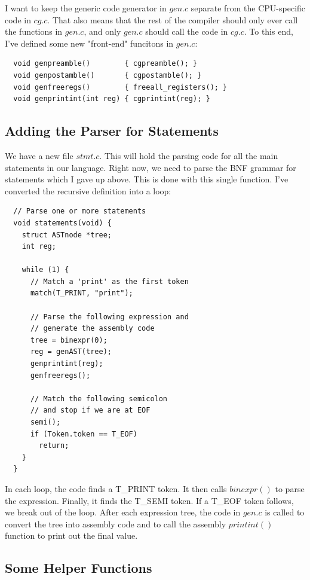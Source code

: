 \documentclass[journal, onecolumn, 12pt]{IEEEtran}
\begin{document}
I want to keep the generic code generator in $gen.c$ separate from the CPU-specific code in $cg.c$. That also means that the rest of the compiler should only ever call the functions in $gen.c$, and only $gen.c$ should call the code in $cg.c$. To this end, I've defined some new "front-end" funcitons in $gen.c$:

\begin{lstlisting}
  void genpreamble()        { cgpreamble(); }
  void genpostamble()       { cgpostamble(); }
  void genfreeregs()        { freeall_registers(); }
  void genprintint(int reg) { cgprintint(reg); }
\end{lstlisting}

\subsection{Adding the Parser for Statements}

We have a new file $stmt.c$. This will hold the parsing code for all the main statements in our language. Right now, we need to parse the BNF grammar for statements which I gave up above. This is done with this single function. I've converted the recursive definition into a loop:

\begin{lstlisting}
  // Parse one or more statements
  void statements(void) {
    struct ASTnode *tree;
    int reg;
  
    while (1) {
      // Match a 'print' as the first token
      match(T_PRINT, "print");
  
      // Parse the following expression and
      // generate the assembly code
      tree = binexpr(0);
      reg = genAST(tree);
      genprintint(reg);
      genfreeregs();
  
      // Match the following semicolon
      // and stop if we are at EOF
      semi();
      if (Token.token == T_EOF)
        return;
    }
  }
\end{lstlisting}

In each loop, the code finds a T\_PRINT token. It then calls $binexpr()$ to parse the expression. Finally, it finds the T\_SEMI token. If a T\_EOF token follows, we break out of the loop. After each expression tree, the code in $gen.c$ is called to convert the tree into assembly code and to call the assembly $printint()$ function to print out the final value.

\subsection{Some Helper Functions}
\end{document}
